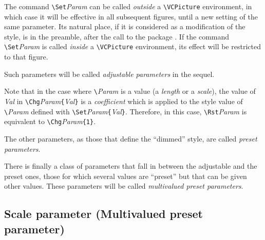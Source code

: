 \documentclass[11pt,twoside]{article}
\newcommand{\noi}{\noindent}
\newcommand{\eg}{{\itshape e.g.}\xspace }
\begin{document}
\medskip
\noi 
The command \verb+\Set+\textsl{Param} can be 
called \emph{outside} a \verb+\VCPicture+ environment, in which case 
it will be effective in all subsequent figures, until a new setting 
of the same parameter.
Its natural place, if it is considered as a modification of the style,
is in the preamble, after the call to the package \VCSG.
If the command \verb+\Set+\textsl{Param} is
called \emph{inside} a \verb+\VCPicture+ environment, its effect will 
be restricted to that figure.

Such parameters will be called \emph{adjustable parameters} in the 
sequel.

Note that in the case where \verb+\+\textsl{Param} is a value
(a \emph{length} or a \emph{scale}), the 
value of \textsl{Val} in \verb+\Chg+\textsl{Param}\verb+{+\textsl{Val}\verb+}+ is a 
\emph{coefficient} which is applied to the style value of \verb+\+\textsl{Param}
defined with \verb+\Set+\textsl{Param}\verb+{+\textsl{Val}\verb+}+.
Therefore, in this case, \verb+\Rst+\textsl{Param} is equivalent to 
\verb+\Chg+\textsl{Param}\verb+{1}+. 

The other parameters, as those that define the ``dimmed'' style,
are called \emph{preset parameters}.

There is finally a class of parameters that fall in between the 
adjustable and the preset ones, those for which several values are 
``preset'' but that can be given other values. 
%
These parameters will be called \emph{multivalued preset parameters}.

\subsection{Scale parameter {\rm(Multivalued preset parameter)}}\label{sec.sca-par}
\end{document}
